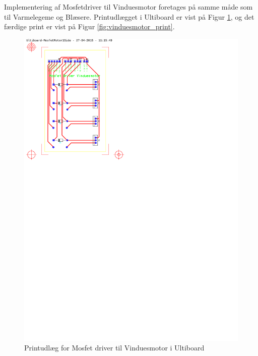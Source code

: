 Implementering af Mosfetdriver til Vinduesmotor foretages på samme måde som til Varmelegeme og Blæsere.
Printudlægget i Ultiboard er vist på Figur \ref{fig:ultiboard_vinduesmotor}, og det færdige print er vist på Figur \ref{fig:vinduesmotor_print}. 

\begin{figure}[h]
\centering 
\includegraphics[width={\textwidth-6.5cm}, trim=50 520 365 30, clip=true, angle =90] {../fig/ultiboard_vinduesmotor.pdf}
\caption{Printudlæg for Mosfet driver til Vinduesmotor i Ultiboard}
\label{fig:ultiboard_vinduesmotor}
\end{figure}

